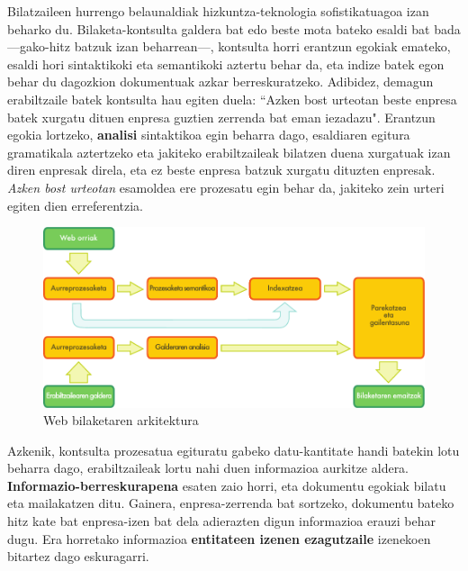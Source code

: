 \begin{multicols}{2}
Bilatzaileen hurrengo belaunaldiak hizkuntza-teknologia sofistikatuagoa izan beharko du. Bilaketa-kontsulta galdera bat edo beste mota bateko esaldi bat bada —gako-hitz batzuk izan beharrean—, kontsulta horri erantzun egokiak emateko, esaldi hori sintaktikoki eta semantikoki aztertu behar da, eta indize batek egon behar du dagozkion dokumentuak azkar berreskuratzeko. Adibidez, demagun erabiltzaile batek kontsulta hau egiten duela: “Azken bost urteotan beste enpresa batek xurgatu dituen enpresa guztien zerrenda bat eman iezadazu". Erantzun egokia lortzeko, \textbf{analisi} sintaktikoa egin beharra dago, esaldiaren egitura gramatikala aztertzeko eta jakiteko erabiltzaileak bilatzen duena xurgatuak izan diren enpresak direla, eta ez beste enpresa batzuk xurgatu dituzten enpresak. \textit{Azken bost urteotan} esamoldea ere prozesatu egin behar da, jakiteko zein urteri egiten dien erreferentzia. 

\begin{figure}[htb]
  \vspace{-9mm}
  \center
  \includegraphics[width=\textwidth]{../_media/basque/web_search_architecture}
  \vspace{-5mm}
  \caption{Web bilaketaren arkitektura}
  \label{fig:websearcharch_eu}
\end{figure}

Azkenik, kontsulta prozesatua egituratu gabeko datu-kantitate handi batekin lotu beharra dago, erabiltzaileak lortu nahi duen informazioa aurkitze aldera. \textbf{Informazio-berreskurapena} esaten zaio horri, eta dokumentu egokiak bilatu eta mailakatzen ditu. Gainera, enpresa-zerrenda bat sortzeko, dokumentu bateko hitz kate bat enpresa-izen bat dela adierazten digun informazioa erauzi behar dugu. Era horretako informazioa \textbf{entitateen izenen ezagutzaile} izenekoen bitartez dago eskuragarri. 


\end{multicols}
